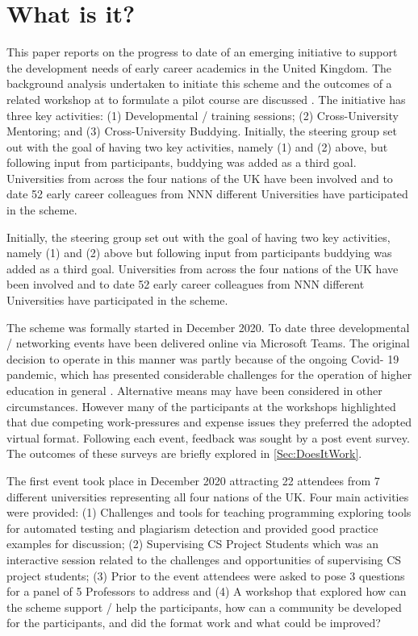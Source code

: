 \documentclass[sigconf]{acmart}
\begin{document}
\section{What is it?}	
\label{sec:What}
This paper reports on the progress to date of an emerging initiative to support the development needs of early career academics in the United Kingdom. The background analysis undertaken to initiate this scheme and the outcomes of a related workshop at  to formulate a pilot course are discussed . The initiative has three key activities: (1) Developmental / training sessions; (2) Cross-University Mentoring; and (3) Cross-University Buddying. Initially, the steering group set out with the goal of having two key activities, namely (1) and (2) above, but following input from participants, buddying was added as a third goal. Universities from across the four nations of the UK have been involved and to date 52 early career colleagues from NNN different Universities have participated in the scheme. 


Initially, the steering group set out with the goal of having two key activities, namely (1) and (2) above but following input from participants buddying was added as a third goal. Universities from across the four nations of the UK have been involved and to date 52 early career colleagues from NNN different Universities have participated in the scheme. 

The scheme was formally started in December 2020. To date three developmental / networking events have been delivered online via Microsoft Teams. The original decision to operate in this manner was partly because of the ongoing Covid- 19 pandemic, which has presented considerable challenges for the operation of higher education in general \cite{CrickCovidUK}. Alternative means may have been considered in other circumstances. However many of the participants at the workshops highlighted that due competing work-pressures and expense issues they preferred the adopted virtual format. Following each event, feedback was sought by a post event survey. The outcomes of these surveys are briefly explored in \ref{Sec:DoesItWork}. 

The first event took place in December 2020 attracting 22 attendees from 7 different universities representing all four nations of the UK. Four main activities were provided: (1) Challenges and tools for teaching programming exploring tools for automated testing and plagiarism detection and provided good practice examples for discussion; (2) Supervising CS Project Students which was an interactive session related to the challenges and opportunities of supervising CS project students; (3) Prior to the event attendees were asked to pose 3 questions for a panel of 5 Professors to address and (4) A workshop that explored how can the scheme support / help the participants, how can a community be developed for the participants, and did the format work and what could be improved?
\end{document}
